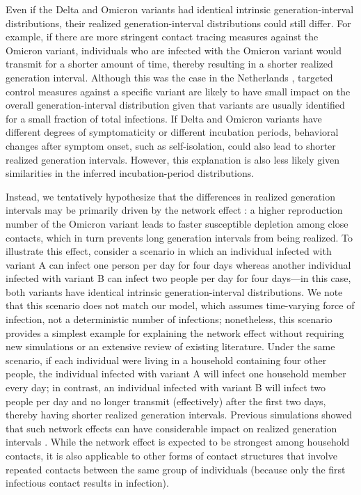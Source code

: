 \documentclass[12pt]{article}
\begin{document}
Even if the Delta and Omicron variants had identical intrinsic generation-interval distributions, their realized generation-interval distributions could still differ.
For example, if there are more stringent contact tracing measures against the Omicron variant, individuals who are infected with the Omicron variant would transmit for a shorter amount of time, thereby resulting in a shorter realized generation interval.
Although this was the case in the Netherlands \citep{backer2021omicron}, targeted control measures against a specific variant are likely to have small impact on the overall generation-interval distribution given that variants are usually identified for a small fraction of total infections.
If Delta and Omicron variants have different degrees of symptomaticity or different incubation periods, behavioral changes after symptom onset, such as self-isolation, could also lead to shorter realized generation intervals.
However, this explanation is also less likely given similarities in the inferred incubation-period distributions.

Instead, we tentatively hypothesize that the differences in realized generation intervals may be primarily driven by the network effect \citep{park2020inferring,hart2022generation}: a higher reproduction number of the Omicron variant leads to faster susceptible depletion among close contacts, which in turn prevents long generation intervals from being realized. 
To illustrate this effect, consider a scenario in which an individual infected with variant A can infect one person per day for four days whereas another individual infected with variant B can infect two people per day for four days---in this case, both variants have identical intrinsic generation-interval distributions.
We note that this scenario does not match our model, which assumes time-varying force of infection, not a deterministic number of infections; nonetheless, this scenario provides a simplest example for explaining the network effect without requiring new simulations or an extensive review of existing literature.
Under the same scenario, if each individual were living in a household containing four other people, the individual infected with variant A will infect one household member every day; in contrast, an individual infected with variant B will infect two people per day and no longer transmit (effectively) after the first two days, thereby having shorter realized generation intervals.
Previous simulations showed that such network effects can have considerable impact on realized generation intervals \citep{park2020inferring}.
While the network effect is expected to be strongest among household contacts, it is also applicable to other forms of contact structures that involve repeated contacts between the same group of individuals (because only the first infectious contact results in infection).
\end{document}

